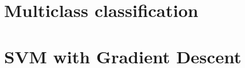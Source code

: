 \documentclass{article}
\begin{document}
\subsection{}

\subsection{}

\subsection{}


\section{Multiclass classification}

\subsection{}

\subsection{}

\subsection{}

\subsection{}


\section{SVM with Gradient Descent}

\subsection{}

\subsection{}

\subsection{}

\subsection{}
\end{document}
